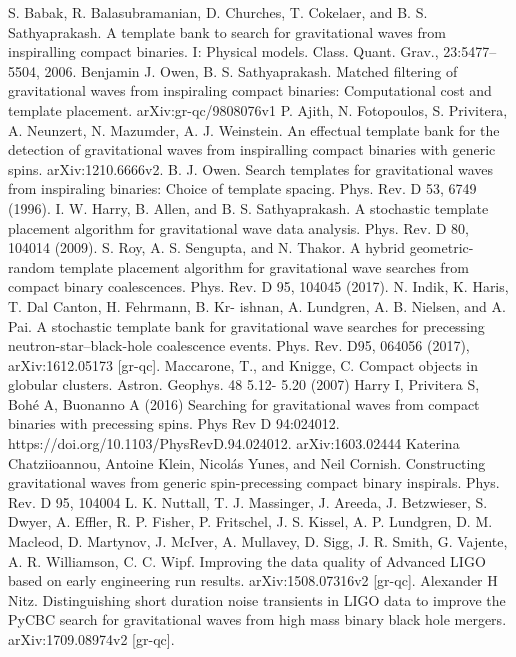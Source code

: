 \documentclass[binding=0.6cm, LaM]{sapthesis}
\begin{document}
\begin{thebibliography}{500}
	 S. Babak, R. Balasubramanian, D. Churches, T. Cokelaer, and B. S. Sathyaprakash. A template bank to search for gravitational waves from inspiralling compact binaries. I: Physical models. Class. Quant. Grav., 23:5477–5504, 2006. 
	 Benjamin J. Owen, B. S. Sathyaprakash. Matched filtering of gravitational waves from inspiraling compact binaries: Computational cost and template placement. arXiv:gr-qc/9808076v1
	 P. Ajith, N. Fotopoulos, S. Privitera, A. Neunzert, N. Mazumder, A. J. Weinstein. An effectual template bank for the detection of gravitational waves from inspiralling compact binaries with generic spins. arXiv:1210.6666v2.
	 B. J. Owen. Search templates for gravitational waves from inspiraling binaries: Choice of template spacing. Phys. Rev. D 53, 6749 (1996). 
	 I. W. Harry, B. Allen, and B. S. Sathyaprakash. A stochastic template placement algorithm for gravitational wave data analysis. Phys. Rev. D 80, 104014 (2009).  
	 S. Roy, A. S. Sengupta, and N. Thakor. A hybrid geometric-random template placement algorithm for gravitational wave searches from compact binary coalescences. Phys. Rev. D 95, 104045 (2017). 
	 N. Indik, K. Haris, T. Dal Canton, H. Fehrmann, B. Kr- ishnan, A. Lundgren, A. B. Nielsen, and A. Pai. A stochastic template bank for gravitational wave searches for precessing neutron-star--black-hole coalescence events. Phys. Rev. D95, 064056 (2017), arXiv:1612.05173 [gr-qc].  
	 Maccarone, T., and Knigge, C. Compact objects in globular clusters. Astron. Geophys. 48 5.12- 5.20 (2007)
	 Harry I, Privitera S, Bohé A, Buonanno A (2016) Searching for gravitational waves from compact binaries with precessing spins. Phys Rev D 94:024012. https://doi.org/10.1103/PhysRevD.94.024012. arXiv:1603.02444
	 Katerina Chatziioannou, Antoine Klein, Nicolás Yunes, and Neil Cornish. Constructing gravitational waves from generic spin-precessing compact binary inspirals. Phys. Rev. D 95, 104004
	 L. K. Nuttall, T. J. Massinger, J. Areeda, J. Betzwieser, S. Dwyer, A. Effler, R. P. Fisher, P. Fritschel, J. S. Kissel, A. P. Lundgren, D. M. Macleod, D. Martynov, J. McIver, A. Mullavey, D. Sigg, J. R. Smith, G. Vajente, A. R. Williamson, C. C. Wipf. Improving the data quality of Advanced LIGO based on early engineering run results. arXiv:1508.07316v2 [gr-qc].
	 Alexander H Nitz. Distinguishing short duration noise transients in LIGO data to improve the PyCBC search for gravitational waves from high mass binary black hole mergers. arXiv:1709.08974v2 [gr-qc].

\end{thebibliography}
\end{document}

